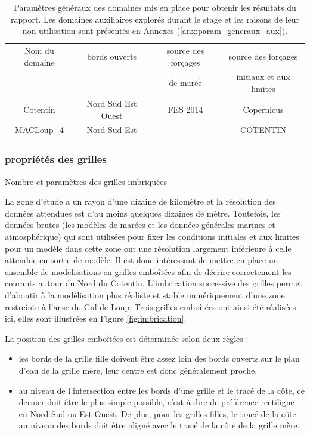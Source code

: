 \documentclass[10pt,a4paper,titlepage]{article}
\begin{document}
\begin{table}[h!]
        \begin{tabular}{||c||c|c|c|}
            \hline
            Nom du domaine & bords ouverts & source des forçages & source des forçages \\
            &  & de marée & initiaux et aux limites \\
            \hline
            Cotentin & Nord Sud Est Ouest & FES 2014 & Copernicus \\
            MACLoup\_4 & Nord Sud Est & - & COTENTIN \\
            \hline
        \end{tabular}
        \caption{
            Paramètres généraux des domaines mis en place pour obtenir les résultats du rapport.
            Les domaines auxiliaires explorés durant le stage et les raisons de leur non-utilisation sont présentés en Annexes (\ref{anx:param_generaux_aux}).
        }
        \label{table:param_generaux}
    \end{table}
    
    \subsubsection{propriétés des grilles}
    \label{subsub:propriete_gilles_ADCL}
    {\color{lightgrey}
        Nombre et paramètres des grilles imbriquées
    }
    
    La zone d'étude a un rayon d'une dizaine de kilomètre et la résolution des données attendues est d'au moins quelques dizaines de mètre.
    Toutefois, les données brutes (les modèles de marées et les données générales marines et atmosphérique) qui sont utilisées pour fixer les conditions initiales et aux limites pour un modèle dans cette zone ont une résolution largement inférieure à celle attendue en sortie de modèle.
    Il est donc intéressant de mettre en place un ensemble de modélisations en grilles emboîtées afin de décrire correctement les courants autour du Nord du Cotentin.
    L'imbrication successive des grilles permet d'aboutir à la modélisation plus réaliste et stable numériquement d'une zone restreinte à l'anse du Cul-de-Loup.
    Trois grilles emboîtées ont ainsi été réalisées ici, elles sont illustrées en Figure \ref{fig:imbrication}.
    
    
    La position des grilles emboîtées est déterminée selon deux règles :
    \begin{itemize}
        \item les bords de la grille fille doivent être assez loin des bords ouverts sur le plan d'eau de la grille mère, leur centre est donc généralement proche,
        \item au niveau de l'intersection entre les bords d'une grille et le tracé de la côte, ce dernier doit être le plus simple possible, c'est à dire de préférence rectiligne en Nord-Sud ou Est-Ouest.
        De plus, pour les grilles filles, le tracé de la côte au niveau des bords doit être aligné avec le tracé de la côte de la grille mère.
    \end{itemize}
    
\end{document}
